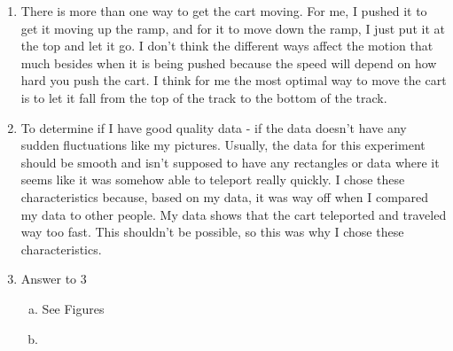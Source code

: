 \documentclass[idxtotoc,hyperref,openany]{labbook} %
\begin{document}

\begin{enumerate}
    \item There is more than one way to get the cart moving. For me, I pushed it to get it moving up the ramp, and for it to move down the ramp, I just put it at the top and let it go. I don't think the different ways affect the motion that much besides when it is being pushed because the speed will depend on how hard you push the cart. I think for me the most optimal way to move the cart is to let it fall from the top of the track to the bottom of the track.
    \item To determine if I have good quality data - if the data doesn't have any sudden fluctuations like my pictures. Usually, the data for this experiment should be smooth and isn't supposed to have any rectangles or data where it seems like it was somehow able to teleport really quickly. I chose these characteristics because, based on my data, it was way off when I compared my data to other people. My data shows that the cart teleported and traveled way too fast. This shouldn't be possible, so this was why I chose these characteristics.
    \item Answer to 3
    \begin{enumerate}[(a)]
        \item See Figures
        \item 
    \end{enumerate}
\end{enumerate}




\end{document}
